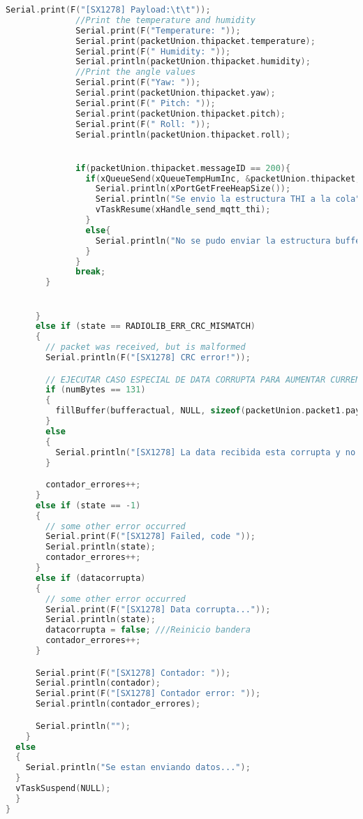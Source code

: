 \begin{lstlisting}[language=C++, caption=Tarea de recepción de datos de aceleración vía Lora en estación base]
              Serial.print(F("[SX1278] Payload:\t\t"));
              //Print the temperature and humidity
              Serial.print(F("Temperature: "));
              Serial.print(packetUnion.thipacket.temperature);
              Serial.print(F(" Humidity: "));
              Serial.println(packetUnion.thipacket.humidity);
              //Print the angle values
              Serial.print(F("Yaw: "));
              Serial.print(packetUnion.thipacket.yaw);
              Serial.print(F(" Pitch: "));
              Serial.print(packetUnion.thipacket.pitch);
              Serial.print(F(" Roll: "));
              Serial.println(packetUnion.thipacket.roll);


              if(packetUnion.thipacket.messageID == 200){
                if(xQueueSend(xQueueTempHumInc, &packetUnion.thipacket, portMAX_DELAY)){
                  Serial.println(xPortGetFreeHeapSize());
                  Serial.println("Se envio la estructura THI a la cola");
                  vTaskResume(xHandle_send_mqtt_thi);
                }
                else{
                  Serial.println("No se pudo enviar la estructura bufferprueba a la cola xQueueBufferACL");
                }
              }
              break;
        }


      }
      else if (state == RADIOLIB_ERR_CRC_MISMATCH)
      {
        // packet was received, but is malformed
        Serial.println(F("[SX1278] CRC error!"));

        // EJECUTAR CASO ESPECIAL DE DATA CORRUPTA PARA AUMENTAR CURRENTPOS Y GUARDAR 0s EN BUFFER DE INTERES
        if (numBytes == 131)
        {
          fillBuffer(bufferactual, NULL, sizeof(packetUnion.packet1.payload), true);
        }
        else
        {
          Serial.println("[SX1278] La data recibida esta corrupta y no es para este receptor");
        }

        contador_errores++;
      }
      else if (state == -1)
      {
        // some other error occurred
        Serial.print(F("[SX1278] Failed, code "));
        Serial.println(state);
        contador_errores++;
      }
      else if (datacorrupta)
      {
        // some other error occurred
        Serial.print(F("[SX1278] Data corrupta..."));
        Serial.println(state);
        datacorrupta = false; ///Reinicio bandera
        contador_errores++;
      }

      Serial.print(F("[SX1278] Contador: "));
      Serial.println(contador);
      Serial.print(F("[SX1278] Contador error: "));
      Serial.println(contador_errores);

      Serial.println("");
    }
  else
  {
    Serial.println("Se estan enviando datos...");
  }
  vTaskSuspend(NULL);
  }
}

\end{lstlisting}